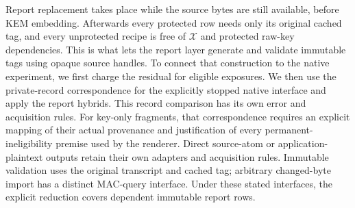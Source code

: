 Report replacement takes place while the source bytes are still available,
before KEM embedding. Afterwards every protected row needs only its original
cached tag, and every unprotected recipe is free of $\mathcal X$ and protected
raw-key dependencies. This is what lets the report layer generate and
validate immutable tags using opaque source handles. To connect that
construction to the native experiment, we first charge the residual for
eligible exposures. We then use the private-record correspondence for the
explicitly stopped native interface and apply the report hybrids.
This record comparison has its own error and acquisition rules. For
key-only fragments, that correspondence requires an explicit mapping of
their actual provenance and justification of every permanent-ineligibility
premise used by the renderer.
Direct source-atom or application-plaintext outputs retain their own
adapters and acquisition rules. Immutable validation uses the original
transcript and cached tag; arbitrary changed-byte import has a distinct
MAC-query interface. Under these stated interfaces, the explicit reduction
covers dependent immutable report rows.
